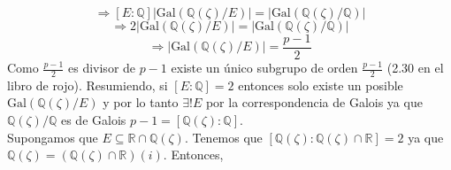 \documentclass{article}
\newcommand{\bb}[1]{\mathbb{#1}}
\newcommand{\R}{\bb{R}}
\begin{document}
\begin{multicols}{2}
$$$$
$$
\Rightarrow
[E:\bb{Q}] | \text{Gal}(\bb{Q}(\zeta)/E) | = | \text{Gal}(\bb{Q}(\zeta)/\bb{Q}) |
$$
$$
\Rightarrow
2 | \text{Gal}(\bb{Q}(\zeta)/E) | = | \text{Gal}(\bb{Q}(\zeta)/\bb{Q}) |
$$
$$
\Rightarrow
| \text{Gal}(\bb{Q}(\zeta)/E) | = \frac{p-1}{2}
$$
Como $\frac{p-1}{2}$ es divisor de $p-1$ existe un único subgrupo de orden $\frac{p-1}{2}$ (2.30 en el libro de rojo). Resumiendo, si $[E:\bb{Q}] = 2$ entonces solo existe un posible $\text{Gal}(\bb{Q}(\zeta)/E)$ y por lo tanto $\exists ! E$ por la correspondencia de Galois ya que $\bb{Q}(\zeta)/\bb{Q}$ es de Galois $p-1 = [\bb{Q}(\zeta):\bb{Q}]$.\\
Supongamos que $E\subseteq \R \cap \bb{Q}(\zeta)$. Tenemos que $[\bb{Q}(\zeta): \bb{Q}(\zeta)\cap \R] = 2$ ya que $\bb{Q}(\zeta) = \left(\bb{Q}(\zeta)\cap \R\right)(i)$. Entonces,
\begin{center}
\end{center}
\end{multicols}
\end{document}

